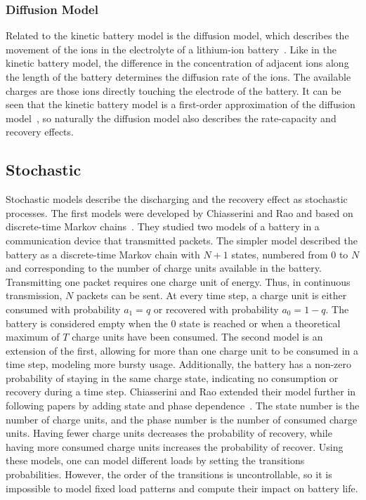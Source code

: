 \documentclass[../zhang_thesis.tex]{subfiles}
\begin{document}
\subsubsection{Diffusion Model}

Related to the kinetic battery model is the diffusion model, which describes the movement of the ions in the electrolyte of a lithium-ion battery~\cite{rakhmatov01}. Like in the kinetic battery model, the difference in the concentration of adjacent ions along the length of the battery determines the diffusion rate of the ions. The available charges are those ions directly touching the electrode of the battery. It can be seen that the kinetic battery model is a first-order approximation of the diffusion
model~\cite{jongerden09}, so naturally the diffusion model also describes the rate-capacity and recovery effects.

\subsection{Stochastic}

Stochastic models describe the discharging and the recovery effect as stochastic processes. The first models were developed by Chiasserini and Rao and based on discrete-time Markov chains~\cite{chiasserini99b}. They studied two models of a battery in a communication device that transmitted packets. The simpler model described the battery as a discrete-time Markov chain with $N+1$ states, numbered from $0$ to $N$ and corresponding to the number of charge units available in the battery.
Transmitting one packet requires one charge unit of energy. Thus, in continuous transmission, $N$ packets can be sent. At every time step, a charge unit is either consumed with probability $a_1=q$ or recovered with probability $a_0=1-q$. The battery is considered empty when the $0$ state is reached or when a theoretical maximum of $T$ charge units have been consumed. The second model is an extension of the first, allowing for more than one charge unit to be consumed in a time step, modeling
more bursty usage. Additionally, the battery has a non-zero probability of staying in the same charge state, indicating no consumption or recovery during a time step. Chiasserini and Rao extended their model further in following papers by adding state and phase dependence~\cite{chiasserini99,chiasserini01,chiasserini01b}. The state number is the number of charge units, and the phase number is the number of consumed charge units. Having fewer charge units decreases the probability of
recovery, while having more consumed charge units increases the probability of recover. Using these models, one can model different loads by setting the transitions probabilities. However, the order of the transitions is uncontrollable, so it is impossible to model fixed load patterns and compute their impact on battery life.
\end{document}
